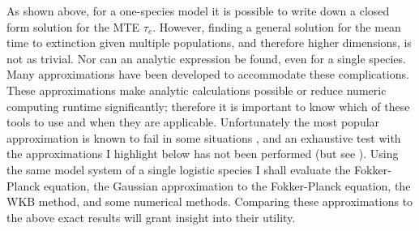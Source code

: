 As shown above, for a one-species model it is possible to write down a closed form solution for the MTE $\tau_e$.
However, finding a general solution for the mean time to extinction given multiple populations, and therefore higher dimensions, is not as trivial. 
Nor can an analytic expression be found, even for a single species. 
Many approximations have been developed to accommodate these complications. 
These approximations make analytic calculations possible or reduce numeric computing runtime significantly; therefore it is important to know which of these tools to use and when they are applicable. 
Unfortunately the most popular approximation is known to fail in some situations \cite{Grasman1983,Doering2005}, and an exhaustive test with the approximations I highlight below has not been performed (but see \cite{Allen2003a,Yu2017}). 
Using the same model system of a single logistic species I shall evaluate the Fokker-Planck equation, the Gaussian approximation to the Fokker-Planck equation, the WKB method, and some numerical methods. %
Comparing these approximations to the above exact results will grant insight into their utility. %

